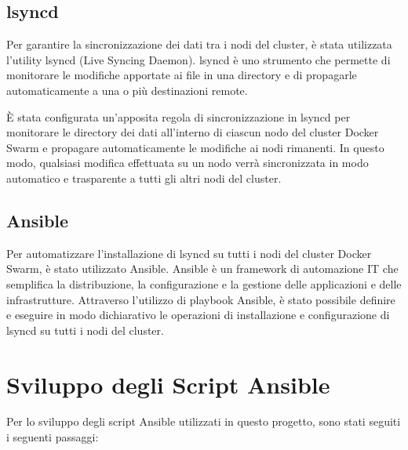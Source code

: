 \documentclass[a4paper, 12pt]{article}
\begin{document}
\subsection{lsyncd}
Per garantire la sincronizzazione dei dati tra i nodi del cluster, 
è stata utilizzata l'utility lsyncd (Live Syncing Daemon). lsyncd è uno strumento 
che permette di monitorare le modifiche apportate ai file in una directory e di 
propagarle automaticamente a una o più destinazioni remote.

È stata configurata un'apposita regola di sincronizzazione in lsyncd per monitorare 
le directory dei dati all'interno di ciascun nodo del cluster Docker Swarm e propagare 
automaticamente le modifiche ai nodi rimanenti. In questo modo, qualsiasi modifica 
effettuata su un nodo verrà sincronizzata in modo automatico e trasparente a tutti 
gli altri nodi del cluster.

\subsection{Ansible}
Per automatizzare l'installazione di lsyncd su tutti i nodi del cluster Docker Swarm, 
è stato utilizzato Ansible. Ansible è un framework di automazione IT che 
semplifica la distribuzione, la configurazione e la gestione delle applicazioni e delle 
infrastrutture. Attraverso l'utilizzo di playbook Ansible, è stato possibile definire e 
eseguire in modo dichiarativo le operazioni di installazione e configurazione di lsyncd 
su tutti i nodi del cluster.

\newpage
\section{Sviluppo degli Script Ansible}
Per lo sviluppo degli script Ansible utilizzati in questo progetto, 
sono stati seguiti i seguenti passaggi:
\end{document}
